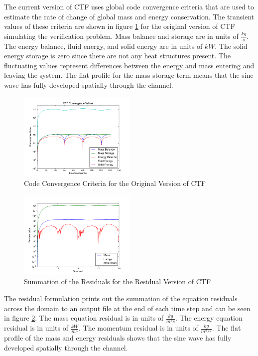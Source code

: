 \documentclass{mc2015}
\begin{document}
The current version of CTF uses global code convergence criteria that are
used to estimate the rate of change of global mass and energy conservation. The
transient values of these criteria are shown in figure \ref{fig:Code_Convergence:Original} for the original version of
CTF simulating the verification problem. Mass balance and storage are in units
of $\frac{kg}{s}$. The energy balance, fluid energy, and solid energy are in units of $kW$.
The solid energy storage is zero since there are not any heat structures present. The fluctuating values
represent differences between the energy and mass entering and leaving the
system. The flat profile for the mass storage term means that the sine wave has
fully developed spatially through the channel. 

\begin{figure}[!h]
	\centering
	\includegraphics[width=0.50\textwidth]{images/Code_Verification/run_00_00/original/results/Convergence_Plot}
	\caption{Code Convergence Criteria for the Original Version of CTF}
	\label{fig:Code_Convergence:Original}
\end{figure}

\begin{figure}[!h]
	\centering
	\includegraphics[width=0.50\textwidth]{images/Code_Verification/run_00_00/residual/results/Residuals_Plot}
	\caption{Summation of the Residuals for the Residual Version of CTF}
	\label{fig:Residuals_Plot}
\end{figure}

The residual formulation prints out the summation of the equation residuals
across the domain to an output file at the end of each time step and can be seen
in figure \ref{fig:Residuals_Plot}. The mass equation residual is in units of
$\frac{kg}{m^{3}s}$. The energy equation residual is in units of
$\frac{kW}{m^{3}}$. The momentum residual is in units of
$\frac{kg}{m^{2}s^{2}}$. The flat profile of the mass and energy residuals shows
that the sine wave has fully developed spatially through the channel.
\end{document}
